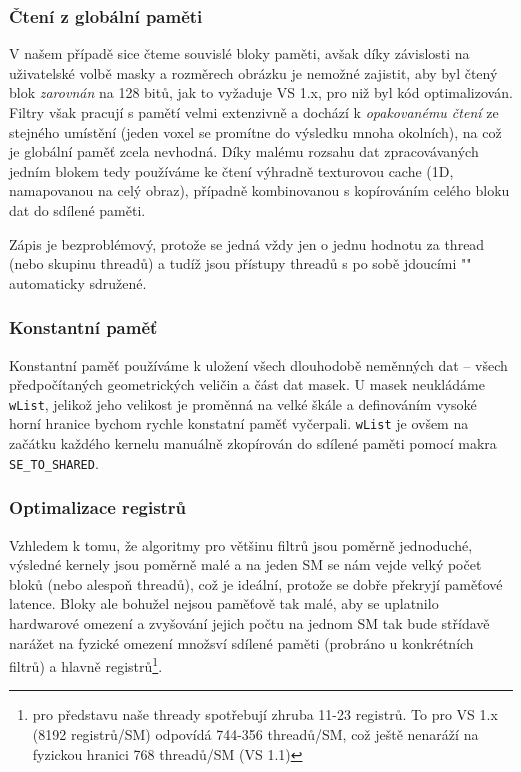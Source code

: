         \subsubsection{Čtení z globální paměti}\label{globální pam opt}

        V našem případě sice čteme souvislé bloky paměti, avšak díky závislosti na uživatelské volbě masky a rozměrech obrázku je nemožné zajistit, aby byl čtený blok \emph{zarovnán} na 128 bitů, jak to vyžaduje VS 1.x, pro niž byl kód optimalizován. Filtry však pracují s pamětí velmi extenzivně a dochází k \emph{opakovanému čtení} ze stejného umístění (jeden voxel se promítne do výsledku mnoha okolních), na což je globální paměť zcela nevhodná. Díky malému rozsahu dat zpracovávaných jedním blokem tedy používáme ke čtení výhradně texturovou cache (1D, namapovanou na celý obraz), případně kombinovanou s kopírováním celého bloku dat do sdílené paměti.

        Zápis je bezproblémový, protože se jedná vždy jen o jednu hodnotu za thread (nebo skupinu threadů) a tudíž jsou přístupy threadů s po sobě jdoucími \Vr"" automaticky sdružené.

        \subsubsection{Konstantní paměť}

        Konstantní paměť používáme k uložení všech dlouhodobě neměnných dat -- všech předpočítaných geometrických veličin a část dat masek. U masek neukládáme {\tt wList}, jelikož jeho velikost je proměnná na velké škále a definováním vysoké horní hranice bychom rychle konstatní paměť vyčerpali. {\tt wList} je ovšem na začátku každého kernelu manuálně zkopírován do sdílené paměti pomocí makra {\tt SE\_TO\_SHARED}.

        \subsubsection{Optimalizace registrů}

        Vzhledem k tomu, že algoritmy pro většinu filtrů jsou poměrně jednoduché, výsledné kernely jsou poměrně malé a na jeden SM se nám vejde velký počet bloků (nebo alespoň threadů), což je ideální, protože se dobře překryjí paměťové latence. Bloky ale bohužel nejsou paměťově tak malé, aby se uplatnilo hardwarové omezení a zvyšování jejich počtu na jednom SM tak bude střídavě narážet na fyzické omezení množsví sdílené paměti (probráno u konkrétních filtrů) a hlavně registrů\footnote{pro představu naše thready spotřebují zhruba 11-23 registrů. To pro VS 1.x (8192 registrů/SM) odpovídá 744-356 threadů/SM, což ještě nenaráží na fyzickou hranici 768 threadů/SM (VS 1.1)}.

